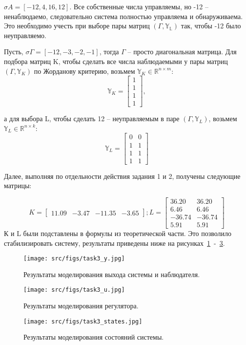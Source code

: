 \(\sigma A = [-12, 4, 16, 12]\). Все собственные числа управляемы, но -12 -- ненаблюдаемо, следовательно система полностью управляема и обнаруживаема. Это необходимо учесть при выборе пары матриц \((\Gamma, \mathds{Y_L})\) так, чтобы -12 было неуправляемо. 

Пусть, \(\sigma \Gamma = [-12, -3, -2, -1]\), тогда \(\Gamma\) -- просто диагональная матрица. Для подбора матриц K, чтобы сделать все числа наблюдаемыми у пары матриц \((\Gamma, \mathds{Y}_K)\) по Жорданову критерию, возьмем \(\mathds{Y}_K \in \mathds{R}^{n \times m}\):
\[\mathds{Y}_K = \begin{bmatrix}
    1\\
    1\\
    1\\
    1
  \end{bmatrix},\]

а для выбора L, чтобы сделать 12 -- неуправляемым в паре \((\Gamma, \mathds{Y}_L)\), возьмем \(\mathds{Y}_L \in \mathds{R}^{n \times k}\):
\[\mathds{Y}_L = \begin{bmatrix}
    0 & 0\\
    1 & 1\\
    1 & 1\\
    1 & 1
  \end{bmatrix}\]

Далее, выполняя по отдельности действия задания 1 и 2, получены следующие матрицы:

\[
    K = \begin{bmatrix}
        11.09 & -3.47 & -11.35 & -3.65
      \end{bmatrix};
    L = \begin{bmatrix}
        36.20 &  36.20\\
        6.46 &  6.46\\
       -36.74 & -36.74\\
        5.91 &  5.91
      \end{bmatrix}
\]
К и L были подставлены в формулы из теоретической части. Это позволило стабилизировать систему, результаты приведены ниже на рисунках~\ref{fig:task3_y}~-~\ref{fig:task3_states}.
\begin{figure}[ht!]
    \centering
    \texttt{[image: src/figs/task3\_y.jpg]}
    \caption{Результаты моделирования выхода системы и наблюдателя.}
    \label{fig:task3_y}
\end{figure}
\begin{figure}[ht!]
    \centering
    \texttt{[image: src/figs/task3\_u.jpg]}
    \caption{Результаты моделирования регулятора.}
    \label{fig:task3_u}
\end{figure}
\begin{figure}[ht!]
    \centering
    \texttt{[image: src/figs/task3\_states.jpg]}
    \caption{Результаты моделирования состояний системы.}
    \label{fig:task3_states}
\end{figure}

